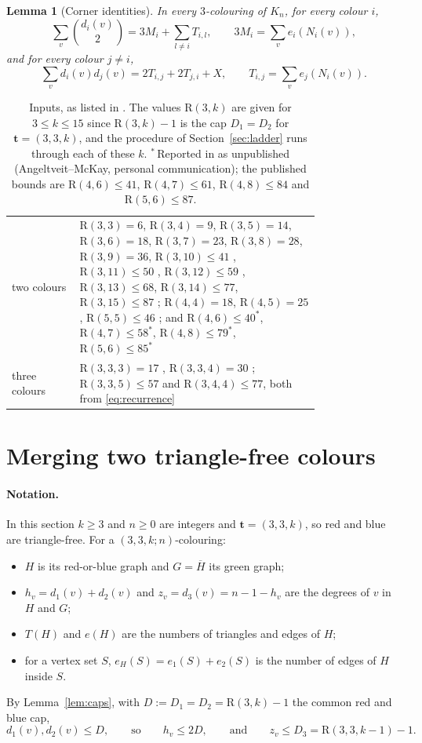 \documentclass[11pt]{article}
\theoremstyle{spacedplain}
\newtheorem{lemma}[theorem]{Lemma}
\theoremstyle{spaceddef}
\theoremstyle{spacedremark}
\newcommand{\R}{\mathrm{R}}
\newcommand{\bt}{\mathbf{t}}
\begin{document}
\begin{lemma}[Corner identities]\label{lem:corners}
In every $3$-colouring of $K_n$, for every colour $i$,
\[
\sum_v\binom{d_i(v)}{2}=3M_i+\sum_{l\ne i}T_{i,l},\qquad 3M_i=\sum_v e_i(N_i(v)),
\]
and for every colour $j\ne i$,
\[
\sum_v d_i(v)d_j(v)=2T_{i,j}+2T_{j,i}+X,\qquad T_{i,j}=\sum_v e_j(N_i(v)).
\]
\end{lemma}

\begin{table}[htbp]
\centering\small
\begin{tabular}{lp{0.785\linewidth}}
\toprule
two colours & $\R(3,3)=6$, $\R(3,4)=9$, $\R(3,5)=14$, $\R(3,6)=18$, $\R(3,7)=23$, $\R(3,8)=28$, $\R(3,9)=36$, $\R(3,10)\le 41$ \cite{Ang25}, $\R(3,11)\le 50$ \cite{GR13}, $\R(3,12)\le 59$ \cite{Les}, $\R(3,13)\le 68$, $\R(3,14)\le 77$, $\R(3,15)\le 87$ \cite{GR13}; $\R(4,4)=18$, $\R(4,5)=25$, $\R(5,5)\le 46$ \cite{AM26}; and $\R(4,6)\le 40^*$, $\R(4,7)\le 58^*$, $\R(4,8)\le 79^*$, $\R(5,6)\le 85^*$\\
three colours & $\R(3,3,3)=17$ \cite{GG55}, $\R(3,3,4)=30$ \cite{CFIM16}; $\R(3,3,5)\le 57$ and $\R(3,4,4)\le 77$, both from \eqref{eq:recurrence}\\
\bottomrule
\end{tabular}
\caption{Inputs, as listed in \cite{Rad26}. The values $\R(3,k)$ are given for $3\le k\le 15$ since $\R(3,k)-1$ is the cap $D_1=D_2$ for $\bt=(3,3,k)$, and the procedure of Section~\ref{sec:ladder} runs through each of these $k$. $^*$\,Reported in \cite[Table~Ib]{Rad26} as unpublished (Angeltveit--McKay, personal communication); the published bounds are $\R(4,6)\le 41$, $\R(4,7)\le 61$, $\R(4,8)\le 84$ and $\R(5,6)\le 87$.}
\label{tab:inputs}
\end{table}

\section{Merging two triangle-free colours}\label{sec:merge}

\paragraph{Notation.}
In this section $k\ge 3$ and $n\ge 0$ are integers and $\bt=(3,3,k)$, so red and blue are triangle-free.
For a $(3,3,k;n)$-colouring:
\begin{itemize}
\item $H$ is its red-or-blue graph and $G=\overline H$ its green graph;
\item $h_v=d_1(v)+d_2(v)$ and $z_v=d_3(v)=n-1-h_v$ are the degrees of $v$ in $H$ and $G$;
\item $T(H)$ and $e(H)$ are the numbers of triangles and edges of $H$;
\item for a vertex set $S$, $e_H(S)=e_1(S)+e_2(S)$ is the number of edges of $H$ inside $S$.
\end{itemize}
By Lemma~\ref{lem:caps}, with $D:=D_1=D_2=\R(3,k)-1$ the common red and blue cap,
\[
d_1(v),d_2(v)\le D,\qquad\text{so}\qquad h_v\le 2D,\qquad\text{and}\qquad z_v\le D_3=\R(3,3,k-1)-1.
\]
\end{document}
